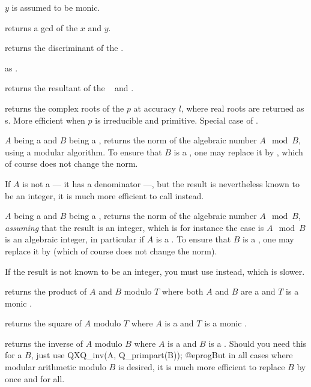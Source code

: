 
 $y$ is assumed to be monic.

 returns a gcd of the  $x$ and $y$.

 returns the discriminant of the 
.

 as .

 returns the resultant of the
~ and .

 returns the complex roots of the
 $p$ at accuracy $l$, where real roots are returned as s.
More efficient when $p$ is irreducible and primitive. Special case
of .


 $A$ being a  and $B$ being a
, returns the norm of the algebraic number $A \mod B$, using a
modular algorithm. To ensure that $B$ is a , one may replace it by
, which of course does not change the norm.

If $A$ is not a  --- it has a denominator ---, but the result is
nevertheless known to be an integer, it is much more efficient to call
 instead.

 $A$ being a  and $B$
being a , returns the norm of the algebraic number $A \mod B$,
\emph{assuming} that the result is an integer, which is for instance the case
is $A\mod B$ is an algebraic integer, in particular if $A$ is a . To
ensure that $B$ is a , one may replace it by 
(which of course does not change the norm).

If the result is not known to be an integer, you must use 
instead, which is slower.

 returns the product of $A$ and $B$
modulo $T$ where both $A$ and $B$ are a  and $T$ is a monic .

 returns the square of $A$
modulo $T$ where $A$ is a  and $T$ is a monic .

 returns the inverse of $A$ modulo $B$
where $A$ is a  and $B$ is a . Should you need this for
a  $B$, just use
\bprog
  QXQ_inv(A, Q_primpart(B));
@eprog\noindent But in all cases where modular arithmetic modulo $B$ is
desired, it is much more efficient to replace $B$ by 
once and for all.


